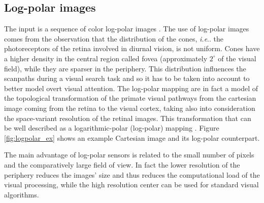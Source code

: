 \documentclass{llncs}
\makeatletter
\DeclareRobustCommand\onedot{\futurelet\@let@token\@onedot}
\def\@onedot{\ifx\@let@token.\else.\null\fi\xspace}
\def\ie{\emph{i.e}\onedot} \def\Ie{\emph{I.e}\onedot}
\makeatother
\begin{document}
\subsection{Log-polar images}
The input is a sequence of color log-polar images \cite{SandiniT80,SandiniQSM00}.
The use of log-polar images comes from the
observation that the distribution of the cones, \ie the
photoreceptors of the retina involved in diurnal vision,
is not uniform. Cones have a higher density
in the central region called fovea (approximately $2^\circ$ of
the visual field), while they are sparser in the
periphery.
This distribution influences the
scanpaths during a visual search task \cite{WolfeG96} and so it has to
be taken into account to better model overt visual
attention. The log-polar mapping are in fact a model of the topological
transformation of the primate visual pathways from the
cartesian image coming from the retina to the visual cortex, taking also into
consideration the space-variant resolution of the retinal images.
This transformation that can be well
described as a logarithmic-polar (log-polar) mapping \cite{SandiniT80}.
Figure \ref{fig:logpolar_ex} shows an example Cartesian image and its
log-polar counterpart.

The main advantage of log-polar sensors is related to the small
number of pixels and the comparatively large field of view.
In fact the lower resolution of the periphery reduces the
images' size and thus reduces the computational load of the
visual processing, while the high resolution center can be
used for standard visual algorithms.

\end{document}
